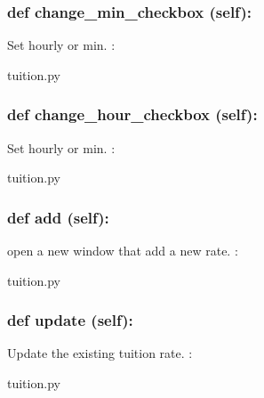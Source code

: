 \hypertarget{class_poly_a14a7ad77ce612b0c54f531d307ee4b39}{
\subsubsection[{def change_min_checkbox (self):}]{\setlength{\rightskip}{0pt plus 5cm}def {change\_min\_checkbox} (self):}}\label{class_poly_a14a7ad77ce612b0c54f531d307ee4b39}
Set hourly or min.
:\begin{DoxyCompactItemize}
\item 
tuition.\-py\end{DoxyCompactItemize}

\hypertarget{class_poly_a14a7ad77ce612b0c54f531d307ee4b39}{
\subsubsection[{def change_hour_checkbox (self):}]{\setlength{\rightskip}{0pt plus 5cm}def {change\_hour\_checkbox} (self):}}\label{class_poly_a14a7ad77ce612b0c54f531d307ee4b39}
Set hourly or min.
:\begin{DoxyCompactItemize}
\item 
tuition.\-py\end{DoxyCompactItemize}

\hypertarget{class_poly_a14a7ad77ce612b0c54f531d307ee4b39}{
\subsubsection[{def add (self):}]{\setlength{\rightskip}{0pt plus 5cm}def {add} (self):}}\label{class_poly_a14a7ad77ce612b0c54f531d307ee4b39}
open a new window that add a new rate.
:\begin{DoxyCompactItemize}
\item 
tuition.\-py\end{DoxyCompactItemize}

\hypertarget{class_poly_a14a7ad77ce612b0c54f531d307ee4b39}{
\subsubsection[{def update (self):}]{\setlength{\rightskip}{0pt plus 5cm}def {update} (self):}}\label{class_poly_a14a7ad77ce612b0c54f531d307ee4b39}
Update the existing tuition rate.
:\begin{DoxyCompactItemize}
\item 
tuition.\-py\end{DoxyCompactItemize}

